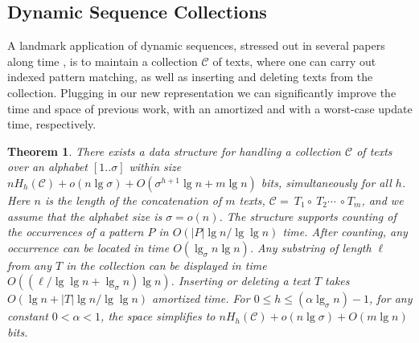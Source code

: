 \documentclass[11pt]{article}
\newcommand{\no}[1]{}
\newtheorem{theorem}{Theorem}
\begin{document}
\no{
\subsection{Block Updates}

\section{Applications} \label{sec:app}

Our new results impact in a number of applications that build on dynamic
sequences. We describe several here.
}

\subsection{Dynamic Sequence Collections} 

A landmark application of dynamic
sequences, stressed out in several papers along time
\cite{CHL04,MN06,CHLS07,MN06,LP07,MN08,GN08,LP09,GN09,HM10,NS10}, 
is to maintain a collection $\mathcal{C}$ of
texts, where one can carry out indexed pattern matching, as well as inserting
and deleting texts from the collection. Plugging in our new representation we 
can significantly improve the time and space of previous work, with an amortized and with
a worst-case update time, respectively.

\begin{theorem} \label{thm:fmindex}
There exists a data structure for handling a collection $\mathcal{C}$ of
texts over an alphabet $[1..\sigma]$ within size
$nH_h(\mathcal{C})+o(n\lg\sigma)+
 O(\sigma^{h+1}\lg n + m\lg n)$ bits, 
simultaneously for all $h$. 
Here $n$ is the length of the concatenation
of $m$ texts, 
 $\mathcal{C}=\ T_1 \circ \ T_2 \cdots$ $\circ\ T_m$, and we assume that
the alphabet size is $\sigma=o(n)$.
The structure supports counting of the occurrences
of a pattern $P$ in $O(|P|\lg n/\lg\lg n)$ time.
After counting, any occurrence can be located in time $O(\lg_\sigma n\lg n)$. 
Any substring of length $\ell$ from any $T$ in the collection can be displayed 
in time $O((\ell/\lg\lg n + \lg_\sigma n) \lg n)$.
Inserting or 
deleting a text $T$ takes $O(\lg n + |T|\lg n/\lg\lg n)$ amortized time.
For $0 \le h \le (\alpha \lg_\sigma n)-1$, for any constant $0<\alpha<1$, the 
space simplifies to $nH_h(\mathcal{C})+o(n\lg\sigma)+O(m\lg n)$ bits.
\end{theorem}
\end{document}

